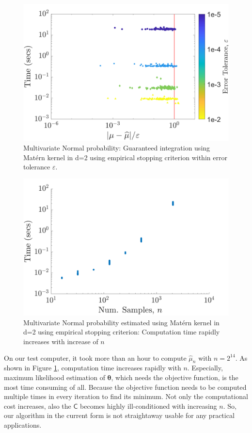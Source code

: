 \documentclass{iitthesis}          %
\newcommand{\bm}[1]{\boldsymbol{#1}}
\newcommand{\vtheta}{{\bm{\theta}}}
\newcommand{\mC}{\mathsf{C}}
\newcommand{\hmu}{\widehat{\mu}}
\begin{document}
\begin{figure}
	\centering
	\includegraphics[width=1.1\linewidth]{MVN_guaranteed_time_Matern_d2_2018-Aug-31}
	\caption{Multivariate Normal probability: Guaranteed integration using Mat\'ern kernel in d=2 using empirical stopping criterion within error tolerance $\varepsilon$.}
	\label{fig:MVN_Metern_d2b2}
\end{figure}
\begin{figure}
	\centering
	\includegraphics[width=1.1\linewidth]{MVN_rapid_n_vs_time_Matern_d2_2018-Aug-31}
	\caption{Multivariate Normal probability estimated using Mat\'ern kernel in d=2 using empirical stopping criterion: Computation time rapidly increases with increase of $n$}
	\label{fig:MVN_Metern_d2b2_time_growth}
\end{figure}

On our test computer, it took more than an hour to compute $\hmu_n$ with $n=2^{14}$. As shown in Figure \ref{fig:MVN_Metern_d2b2}, computation time increases rapidly with $n$. 
Especially, maximum likelihood estimation of $\vtheta$, which needs the objective function, is the most time consuming of all. 
Because the objective function needs to be computed multiple times in every iteration to find its minimum. 
Not only the computational cost increases, also the $\mC$ becomes highly ill-conditioned with increasing $n$.
So, our algorithm in the current form is not straightaway usable for any practical applications.
\end{document}
